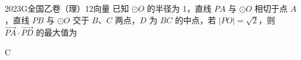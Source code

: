 
\begin{problem}{2023}{G}{全国乙卷（理）}{12}{向量}
已知 $ \odot O $ 的半径为 1，直线 $ PA $ 与 $ \odot O $ 相切于点 $ A $，直线 $ PB $ 与 $ \odot O $ 交于 $ B $、$ C $ 两点，$ D $ 为 $ BC $ 的中点，若 $ |PO| = \sqrt{2} $，则 $ \overrightarrow{PA} \cdot \overrightarrow{PD} $ 的最大值为
\begin{choices}
\end{choices}
\end{problem}

\begin{answer}
C
\end{answer}

\begin{solutions}

\end{solutions}